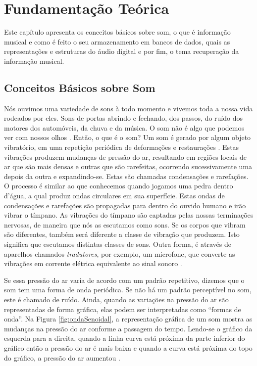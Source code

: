 \chapter{Fundamentação Teórica}
Este capítulo apresenta os conceitos básicos sobre som, o que é informação musical e como é feito o seu armazenamento em bancos de dados, quais as representações e estruturas do áudio digital e por fim, o tema recuperação da informação musical.

\section{Conceitos Básicos sobre Som} \label{conceitoSom}
Nós ouvimos uma variedade de sons à todo momento e vivemos toda a nossa vida rodeados por eles. Sons de portas abrindo e fechando, dos passos, do ruído dos motores dos automóveis, da chuva e da música. O som não é algo que podemos ver com nossos olhos \cite{miletto2004}. Então, o que é o som? 
Um som é gerado por algum objeto vibratório, em uma repetição periódica de deformações e restaurações \cite{muller2007}. Estas vibrações produzem mudanças de pressão do ar, resultando em regiões locais de ar que são mais densas e outras que são rarefeitas, ocorrendo sucessivamente uma depois da outra e expandindo-se. Estas são chamadas condensações e rarefações. O processo é similar ao que conhecemos quando jogamos uma pedra dentro d’água, a qual produz ondas circulares em sua superfície. Estas ondas de condensações e rarefações são propagadas para dentro do ouvido humano e irão vibrar o tímpano. As vibrações do tímpano são captadas pelas nossas terminações nervosas, de maneira que nós as escutamos como sons. Se os corpos que vibram são diferentes, também será diferente a classe de vibração que produzem. Isto significa que escutamos distintas classes de sons.
Outra forma, é através de aparelhos chamados \textit{tradutores}, por exemplo, um microfone, que converte as vibrações em corrente elétrica equivalente ao sinal sonoro \cite{paulozuben2004}.

Se essa pressão do ar varia de acordo com um padrão repetitivo, dizemos que o som tem uma forma de onda periódica. Se não há um padrão perceptível no som, este é chamado de ruído. Ainda, quando as variações na pressão do ar são representadas de forma gráfica, elas podem ser interpretadas como “formas de onda”. Na Figura \ref{fig:ondaSenoidal}, a representação gráfica de um som mostra as mudanças na pressão do ar conforme a passagem do tempo. Lendo-se o gráfico da esquerda para a direita, quando a linha curva está próxima da parte inferior do gráfico então a pressão do ar é mais baixa e quando a curva está próxima do topo do gráfico, a pressão do ar aumentou \cite{miletto2004}.

